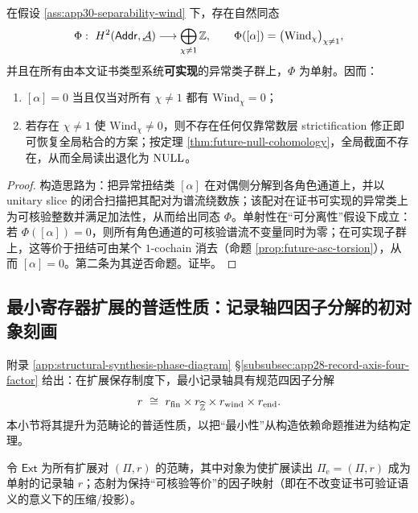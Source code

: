 \begin{theorem}\label{thm:app30-h2-injection-by-wind}
在假设 \ref{ass:app30-separability-wind} 下，存在自然同态
$$
\Phi:\ H^2(\Addr,\underline{\mathcal{A}})\longrightarrow \bigoplus_{\chi\neq 1}\ZZ,
\qquad
\Phi([\alpha])=\bigl(\mathrm{Wind}_\chi\bigr)_{\chi\neq 1},
$$
并且在所有由本文证书类型系统\textbf{可实现}的异常类子群上，$\Phi$ 为单射。因而：
\begin{enumerate}
  \item $[\alpha]=0$ 当且仅当对所有 $\chi\neq 1$ 都有 $\mathrm{Wind}_\chi=0$；
  \item 若存在 $\chi\neq 1$ 使 $\mathrm{Wind}_\chi\neq 0$，则不存在任何仅靠常数层 strictification 修正即可恢复全局粘合的方案；按定理 \ref{thm:future-null-cohomology}，全局截面不存在，从而全局读出退化为 $\mathrm{NULL}$。
\end{enumerate}
\end{theorem}

\begin{proof}
构造思路为：把异常扭结类 $[\alpha]$ 在对偶侧分解到各角色通道上，并以 unitary slice 的闭合扫描把其配对为谱流绕数族；该配对在证书可实现的异常类上为可核验整数并满足加法性，从而给出同态 $\Phi$。单射性在“可分离性”假设下成立：若 $\Phi([\alpha])=0$，则所有角色通道的可核验谱流不变量同时为零；在可实现子群上，这等价于扭结可由某个 $1$-cochain 消去（命题 \ref{prop:future-asc-torsion}），从而 $[\alpha]=0$。第二条为其逆否命题。证毕。
\end{proof}

\subsection{最小寄存器扩展的普适性质：记录轴四因子分解的初对象刻画}\label{subsec:app30-initial-object}

附录 \ref{app:structural-synthesis-phase-diagram} \S\ref{subsubsec:app28-record-axis-four-factor} 给出：在扩展保存制度下，最小记录轴具有规范四因子分解
$$
r\ \cong\ r_{\mathrm{fin}}\times r_{\widehat{\mathbb{Z}}}\times r_{\mathrm{wind}}\times r_{\mathrm{end}}.
$$
本小节将其提升为范畴论的普适性质，以把“最小性”从构造依赖命题推进为结构定理。

\begin{definition}[扩展保存范畴]\label{def:app30-ext-category}
令 $\mathsf{Ext}$ 为所有扩展对 $(\Pi,r)$ 的范畴，其中对象为使扩展读出 $\Pi_{\mathrm e}=(\Pi,r)$ 成为单射的记录轴 $r$；态射为保持“可核验等价”的因子映射（即在不改变证书可验证语义的意义下的压缩/投影）。
\end{definition}

